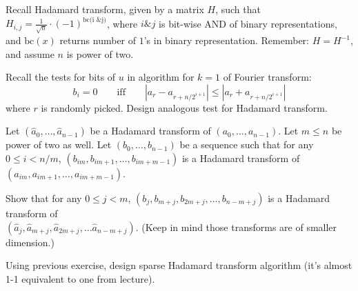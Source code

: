 \documentclass[12pt]{uebung}
\begin{document}
 

\newcommand{\bigo}{\mathcal{O}}
\renewcommand{\aufgname}{Exercise}

Recall Hadamard transform, given by a matrix $H$, such that $H_{i,j} = \frac{1}{\sqrt{n}} \cdot (-1)^{\textrm{bc(i \& j)}}$, where $i \& j$ is bit-wise AND of binary representations, and $\text{bc}(x)$ returns number of $1$'s in binary representation. Remember: $H = H^{-1}$, and assume $n$ is power of two.
\begin{aufg}
Recall the tests for bits of $u$ in algorithm for $k=1$ of Fourier transform:
$$b_{i} = 0 \quad\quad\text{iff}\quad\quad |a_r - a_{r+n/2^{i+1}}| \le |a_r + a_{r+n/2^{i+1}}|$$
where $r$ is randomly picked. Design analogous test for Hadamard transform.
\end{aufg}

\begin{aufg}[2 pts]
Let $(\hat{a}_0,\ldots,\hat{a}_{n-1})$ be a Hadamard transform of $(a_0,\ldots,a_{n-1})$. Let $m \le n$ be power of two as well. Let $(b_0,\ldots,b_{n-1})$ be a sequence such that for any $0 \le i < n/m$, $(b_{im},b_{im+1},\ldots,b_{im+m-1})$ is a Hadamard transform of $(a_{im},a_{im+1},\ldots,a_{im+m-1})$. 

Show that for any $0 \le j < m$, $(b_{j},b_{m+j}, b_{2m+j}, \ldots, b_{n-m+j})$ is a Hadamard transform of\\ $(\hat{a}_{j},\hat{a}_{m+j}, \hat{a}_{2m+j}, \ldots \hat{a}_{n-m+j})$. (Keep in mind those transforms are of smaller dimension.)
\end{aufg}

\begin{aufg}
Using previous exercise, design sparse Hadamard transform algorithm (it's almost 1-1 equivalent to one from lecture).
\end{aufg}
\end{document}
